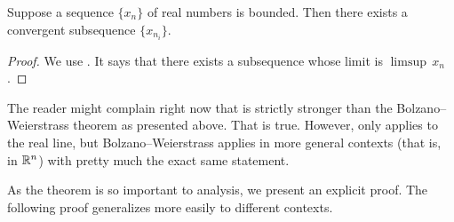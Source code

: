 \begin{thm}\label{thm:bwseq}
Suppose a sequence $\{ x_n \}$ of real numbers is bounded.
Then there exists a convergent subsequence $\{ x_{n_i} \}$.
\end{thm}

\begin{proof}
We use .  It says that there exists
a subsequence whose limit is $\limsup \, x_n$.
\end{proof}

The reader might complain right now that 
 is strictly stronger than the
Bolzano--Weierstrass theorem as presented above.  That is true.
However, 
 only applies to the real line, but
Bolzano--Weierstrass applies in more general contexts (that is, in ${\mathbb{R}}^n$)
with pretty much the exact same statement.

As the theorem is so important to analysis, we present an explicit
proof.
The following proof generalizes more easily to different contexts.

